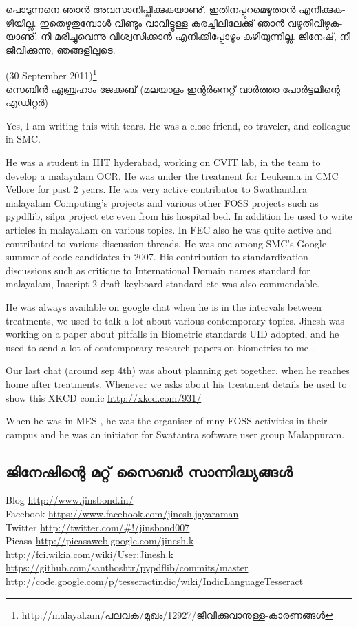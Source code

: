 ­പൊ­ടു­ന്ന­നെ ഞാന്‍ അവ­സാ­നി­പ്പി­ക്കു­ക­യാ­ണു്. ഇതി­ന­പ്പു­റ­മെ­ഴു­താന്‍ എനി­ക്കു­ക­ഴി­യി­ല്ല. ഇതെ­ഴു­തു­മ്പോള്‍ വീ­ണ്ടും വാ­വി­ട്ടു­ള്ള 
കര­ച്ചി­ലി­ലേ­ക്കു് ഞാന്‍ വഴു­തി­വീ­ഴു­ക­യാ­ണു്. നീ മരി­ച്ചു­വെ­ന്നു വി­ശ്വ­സി­ക്കാന്‍ എനി­ക്കി­പ്പോ­ഴും കഴി­യു­ന്നി­ല്ല. ജി­നേ­ഷ്, നീ ജീ­വി­ക്കു­ന്നു, 
ഞങ്ങ­ളി­ലൂ­ടെ­.

(30  September 2011)\footnote{http://malayal.am/പലവക/മുഖം/12927/ജീവിക്കുവാനുള്ള-കാരണങ്ങള്‍}\\
സെ­ബിന്‍ ഏബ്ര­ഹാം ജേ­ക്ക­ബ് (മലയാളം ഇന്റര്‍നെറ്റ് വാര്‍ത്താ പോര്‍ട്ടലിന്റെ എഡിറ്റര്‍)

\newpage

{\vskip 2pt}
{\engtext
Yes, I am writing this with tears. He was a close friend,
co-traveler, and colleague in SMC.

He was a student in IIIT hyderabad, working on CVIT lab, in the team
to develop a malayalam OCR. He was under the treatment for Leukemia in
CMC Vellore for past 2 years. He was very active contributor to
Swathanthra malayalam Computing's projects and various other FOSS
projects such as pypdflib, silpa project etc even from his hospital
bed. In addition he used to write articles in malayal.am on various
topics. In FEC also he was quite active and contributed to various
discussion threads. He was one among SMC's  Google summer of code
candidates in 2007. His contribution to standardization discussions
such as critique to International Domain names standard for malayalam,
Inscript 2 draft keyboard standard etc was also commendable.

He was always available on google chat when he is in the intervals
between treatments, we used to talk a lot about various contemporary
topics. Jinesh was working on a paper about pitfalls in Biometric
standards UID adopted, and he used to send a lot of contemporary
research papers on biometrics to me .

Our last chat (around sep 4th) was about planning get together, when
he reaches home after treatments.
Whenever we asks about his treatment details he used to show this XKCD comic
\url{http://xkcd.com/931/}

When he was in MES , he was the organiser of mny FOSS activities in
their campus and he was an initiator for Swatantra software user group
Malappuram.
}

\subsection*{­ജി­നേ­ഷി­ന്റെ മറ്റ് സൈ­ബര്‍ സാ­ന്നി­ദ്ധ്യ­ങ്ങള്‍}
Blog \url{http://www.jinsbond.in/} \\
Facebook \url{https://www.facebook.com/jinesh.jayaraman} \\
Twitter \url{http://twitter.com/#!/jinsbond007} \\
Picasa \url{http://picasaweb.google.com/jinesh.k} \\
\url{http://fci.wikia.com/wiki/User:Jinesh.k} \\
\url{https://github.com/santhoshtr/pypdflib/commits/master} \\
\url{http://code.google.com/p/tesseractindic/wiki/IndicLanguageTesseract}

\newpage
